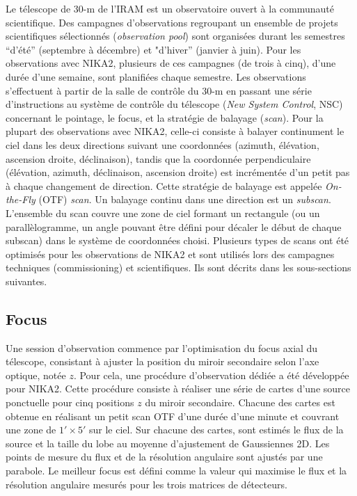 Le télescope de 30-m de l'IRAM est un observatoire ouvert à la
communauté scientifique. Des campagnes d'observations regroupant un
ensemble de projets scientifiques sélectionnés (\emph{observation
  pool}) sont organisées durant les semestres ``d'été''
(septembre à décembre) et "d'hiver'' (janvier à juin). Pour les
observations avec NIKA2, plusieurs de ces campagnes (de trois à cinq),
d'une durée d'une semaine, sont planifiées chaque semestre. Les
observations s'effectuent à partir de la salle de contrôle du 30-m en
passant une série d'instructions au système de contrôle du télescope
(\emph{New System Control}, NSC) concernant le pointage, le focus, et
la stratégie de balayage (\emph{scan}).
Pour la plupart des observations avec NIKA2, celle-ci
consiste à balayer continument le ciel dans les deux directions
suivant une coordonnées (azimuth, élévation, ascension droite,
déclinaison), tandis que la coordonnée perpendiculaire (élévation, azimuth,
déclinaison, ascension droite) est incrémentée d'un petit pas à chaque
changement de direction. Cette stratégie de balayage est appelée
\emph{On-the-Fly} (OTF) \emph{scan}. Un balayage continu dans une
direction est un \emph{subscan}. L'ensemble du scan couvre une zone de
ciel formant un rectangule (ou un parallèlogramme, un angle pouvant
être défini pour décaler le début de chaque subscan) dans le système
de coordonnées choisi. Plusieurs types de scans ont été optimisés pour les
observations de NIKA2 et sont utilisés lors des
campagnes techniques (commissioning) et scientifiques. Ils sont
décrits dans les sous-sections suivantes.

\subsection{Focus}
\label{se:focus}

Une session d'observation commence par l'optimisation du focus axial
du télescope, consistant à ajuster la position du miroir secondaire
selon l'axe optique, notée $z$. Pour cela, une procédure d'observation
dédiée a été développée pour NIKA2. Cette procédure consiste à
réaliser une série de cartes d'une source ponctuelle pour cinq
positions $z$ du miroir secondaire. Chacune des cartes est obtenue en
réalisant un petit scan OTF d'une durée d'une minute et couvrant une
zone de $1' \times 5'$ sur le ciel. Sur chacune des cartes, sont estimés
le flux de la source et la taille du lobe au moyenne d'ajustement de
Gaussiennes 2D. Les points de mesure du flux et de la résolution
angulaire sont ajustés par une parabole. Le meilleur focus est défini
comme la valeur qui maximise le flux et la résolution angulaire
mesurés pour les trois matrices de détecteurs.


